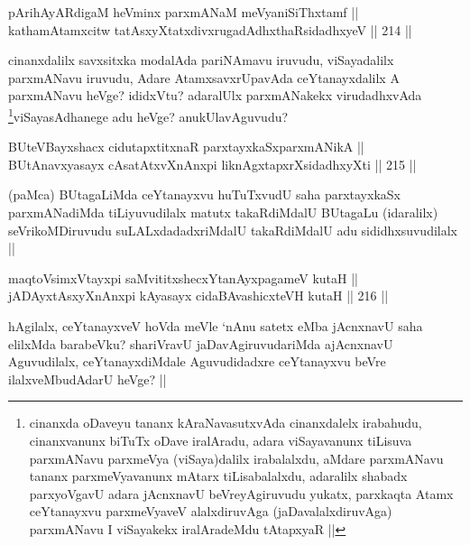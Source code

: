 
\begin{shl}
pArihAyARdigaM heVminx parxmANaM meVyaniSiThxtamf || \\
kathamAtamxcitw tatAsxyXtatxdivxrugadAdhxthaRsidadhxyeV ||  214 ||  
\end{shl}

\begin{artha}
cinanxdalilx savxsitxka modalAda pariNAmavu iruvudu, viSayadalilx parxmANavu iruvudu, Adare AtamxsavxrUpavAda ceYtanayxdalilx A parxmANavu heVge? ididxVtu? adaralUlx parxmANakekx virudadhxvAda \footnote{cinanxda oDaveyu tananx kAraNavasutxvAda cinanxdalelx irabahudu, cinanxvanunx biTuTx oDave iralAradu, adara viSayavanunx tiLisuva parxmANavu parxmeVya (viSaya)dalilx irabalalxdu, aMdare parxmANavu tananx parxmeVyavanunx mAtarx tiLisabalalxdu, adaralilx shabadx parxyoVgavU adara jAcnxnavU beVreyAgiruvudu yukatx, parxkaqta Atamx ceYtanayxvu parxmeVyaveV alalxdiruvAga (jaDavalalxdiruvAga) parxmANavu I viSayakekx iralAradeMdu tAtapxyaR ||}viSayasAdhanege adu heVge? anukUlavAguvudu?
\end{artha}


\begin{shl}
BUteVBayxshacx cidutapxtitxnaR parxtayxkaSxparxmANikA || \\
BUtAnavxyasayx cAsatAtxvXnAnxpi liknAgxtapxrXsidadhxyXti ||  215 ||  
\end{shl}

\begin{artha}
(paMca) BUtagaLiMda ceYtanayxvu huTuTxvudU saha parxtayxkaSx parxmANadiMda tiLiyuvudilalx matutx takaRdiMdalU BUtagaLu (idaralilx)  seVrikoMDiruvudu suLALxdadadxriMdalU takaRdiMdalU adu sididhxsuvudilalx ||
\end{artha}


\begin{shl}
maqtoV\s simxVtayxpi saMvititxshecxYtanAyxpagameV kutaH || \\
jADAyxtAsxyXnAnxpi kAyasayx cidaBAvashicxteVH kutaH ||  216 ||  
\end{shl}

\begin{artha}
hAgilalx, ceYtanayxveV hoVda meVle `nAnu satetx eMba jAcnxnavU saha elilxMda barabeVku? shariVravU jaDavAgiruvudariMda ajAcnxnavU Aguvudilalx, ceYtanayxdiMdale Aguvudidadxre ceYtanayxvu beVre ilalxveMbudAdarU heVge? ||
\end{artha}

